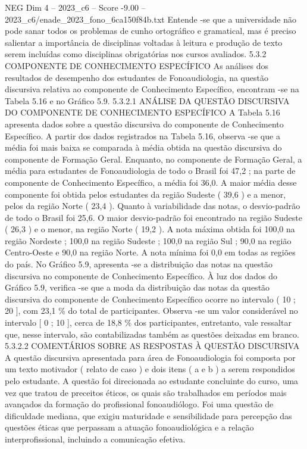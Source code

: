 \begin{textsample}{NEG Dim 4 – 2023\_c6 – Score -9.00 – 2023\_c6/enade\_2023\_fono\_6ca150f84b.txt}
Entende -se que a universidade não pode sanar todos os problemas de cunho ortográfico e gramatical, mas é preciso salientar a importância de disciplinas voltadas à leitura e produção de texto serem incluídas como disciplinas obrigatórias nos cursos avaliados. 5.3.2 COMPONENTE DE CONHECIMENTO ESPECÍFICO As análises dos resultados de desempenho dos estudantes de Fonoaudiologia, na questão discursiva relativa ao componente de Conhecimento Específico, encontram -se na Tabela 5.16 e no Gráfico 5.9. 5.3.2.1 ANÁLISE DA QUESTÃO DISCURSIVA DO COMPONENTE DE CONHECIMENTO ESPECÍFICO A Tabela 5.16 apresenta dados sobre a questão discursiva do componente de Conhecimento Específico.
A partir dos dados registrados na Tabela 5.16, observa -se que a média foi mais baixa se comparada à média obtida na questão discursiva do componente de Formação Geral.
Enquanto, no componente de Formação Geral, a média para estudantes de Fonoaudiologia de todo o Brasil foi 47,2 ; na parte de componente de Conhecimento Específico, a média foi 36,0.
A maior média desse componente foi obtida pelos estudantes da região Sudeste ( 39,6 ) e a menor, pelos da região Norte ( 23,4 ).
Quanto à variabilidade das notas, o desvio-padrão de todo o Brasil foi 25,6.
O maior desvio-padrão foi encontrado na região Sudeste ( 26,3 ) e o menor, na região Norte ( 19,2 ).
A nota máxima obtida foi 100,0 na região Nordeste ; 100,0 na região Sudeste ; 100,0 na região Sul ; 90,0 na região Centro-Oeste e 90,0 na região Norte.
A nota mínima foi 0,0 em todas as regiões do país.
No Gráfico 5.9, apresenta -se a distribuição das notas na questão discursiva no componente de Conhecimento Específico.
À luz dos dados do Gráfico 5.9, verifica -se que a moda da distribuição das notas da questão discursiva do componente de Conhecimento Específico ocorre no intervalo ( 10 ; 20 ], com 23,1 \% do total de participantes.
Observa -se um valor considerável no intervalo [ 0 ; 10 ], cerca de 18,8 \% dos participantes, entretanto, vale ressaltar que, nesse intervalo, são contabilizadas também as questões deixadas em branco. 5.3.2.2 COMENTÁRIOS SOBRE AS RESPOSTAS À QUESTÃO DISCURSIVA A questão discursiva apresentada para área de Fonoaudiologia foi composta por um texto motivador ( relato de caso ) e dois itens ( a e b ) a serem respondidos pelo estudante.
A questão foi direcionada ao estudante concluinte do curso, uma vez que tratou de preceitos éticos, os quais são trabalhados em períodos mais avançados da formação do profissional fonoaudiólogo.
Foi uma questão de dificuldade mediana, que exigiu maturidade e sensibilidade para percepção das questões éticas que perpassam a atuação fonoaudiológica e a relação interprofissional, incluindo a comunicação efetiva.

\end{textsample}
